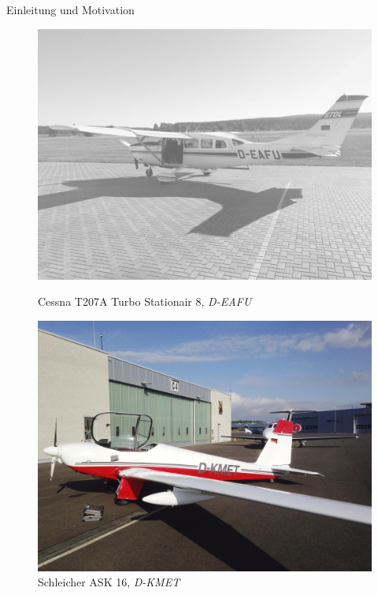 \documentclass[ucs,9pt]{beamer}
\begin{document}
\begin{frame}{Einleitung und Motivation}
	\addtocounter{figure}{-2}
	\addtocounter{framenumber}{-1}
	\begin{figure}
		\begin{minipage}{0.45\textwidth}
			\includegraphics[width=\textwidth]{./docmedia/cessna_grey.jpg}
			\caption{Cessna T207A Turbo Stationair 8, \textit{D-EAFU}}
		\end{minipage}
		\begin{minipage}{0.45\textwidth}
			\includegraphics[width=\textwidth]{./docmedia/ask16.jpg}
			\caption{Schleicher ASK 16, \textit{D-KMET}}
		\end{minipage}
	\end{figure}
\end{frame}
\end{document}
